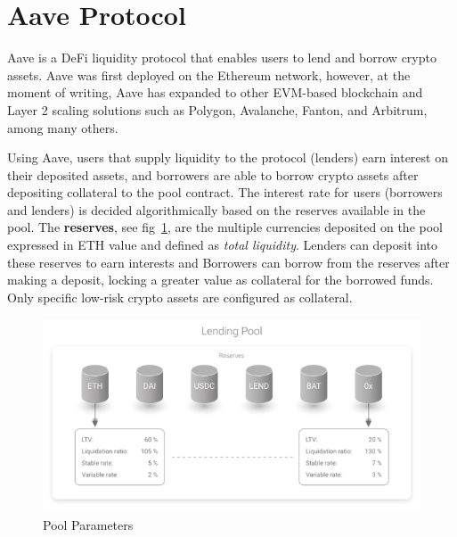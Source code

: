 \documentclass[11pt,a4paper]{report}
\begin{document}
\section{Aave Protocol}\label{sec:aave}
Aave\cite{aaveV1}\cite{aaveV2}\cite{aaveV3} is a DeFi liquidity protocol that enables users to lend and borrow crypto assets. Aave was first deployed on the Ethereum network, however, at the moment of writing, Aave has expanded to other EVM-based blockchain and Layer 2 scaling solutions such as  Polygon\cite{polygon}, Avalanche\cite{avax}, Fanton\cite{fanton}, and Arbitrum\cite{arbitrum}, among many others.

Using Aave, users that supply liquidity to the protocol (lenders) earn interest on their deposited assets, and borrowers are able to borrow crypto assets after depositing collateral to the pool contract. The interest rate for users (borrowers and lenders) is decided algorithmically based on the reserves available in the pool. The \textbf{reserves}, see fig~\ref{fig:pool}, are the multiple currencies deposited on the pool expressed in ETH value and defined as \textit{total liquidity}. Lenders can deposit into these reserves to earn interests and Borrowers can borrow from the reserves after making a deposit, locking a greater value as collateral for the borrowed funds. Only specific low-risk crypto assets are configured as collateral.\label{reserve}  

\begin{figure}[htp]
	\centering
	\includegraphics[width=1\textwidth]{./images/lp_reserves}
	\caption{Pool Parameters\cite{aaveV1}}
	\label{fig:pool}
\end{figure}
\end{document}
